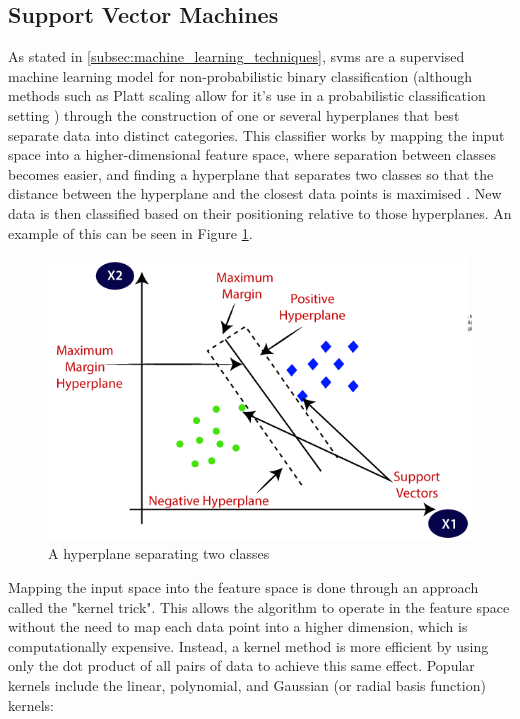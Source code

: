 
\subsection{Support Vector Machines}

As stated in \ref{subsec:machine_learning_techniques}, \glspl{svm} are a supervised machine learning model for non-probabilistic binary classification (although methods such as Platt scaling allow for it's use in a probabilistic classification setting \citep{platt1999}) through the construction of one or several hyperplanes that best separate data into distinct categories. This classifier works by mapping the input space into a higher-dimensional feature space, where separation between classes becomes easier, and finding a hyperplane that separates two classes so that the distance between the hyperplane and the closest data points is maximised \citep{Buczak2016}. New data is then classified based on their positioning relative to those hyperplanes. An example of this can be seen in Figure \ref{fig:svm_hyperplane}.

\begin{figure}
    \centering
    \includegraphics[width = \textwidth]{img/parts/app/Support Vector Machine.png}
    \caption{A hyperplane separating two classes \citep{JavaTpoint_SVM}}
    \label{fig:svm_hyperplane}
\end{figure}

Mapping the input space into the feature space is done through an approach called the "kernel trick". This allows the algorithm to operate in the feature space without the need to map each data point into a higher dimension, which is computationally expensive. Instead, a kernel method is more efficient by using only the dot product of all pairs of data to achieve this same effect. Popular kernels include the linear, polynomial, and Gaussian (or radial basis function) kernels:

